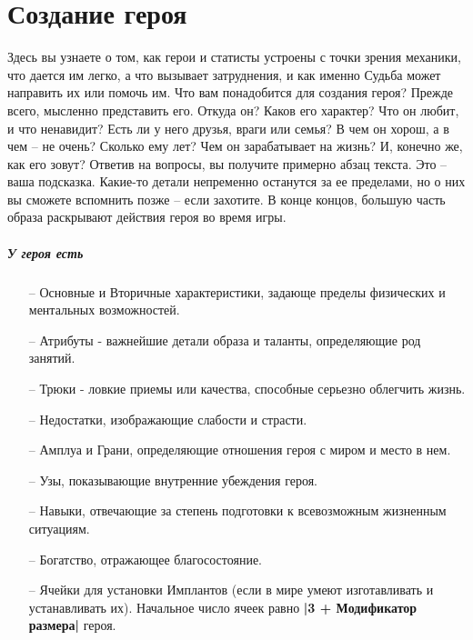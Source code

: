 \chapter{Создание героя}
Здесь вы узнаете о том, как герои и статисты устроены с точки зрения механики, что дается им легко, а что вызывает затруднения, и как именно Судьба может направить их или помочь им.
\newline Что вам понадобится для создания героя? Прежде всего, мысленно представить его. Откуда он? Каков его характер? Что он любит, и что ненавидит? Есть ли у него друзья, враги или семья? В чем он хорош, а в чем – не очень? Сколько ему лет? Чем он зарабатывает на жизнь? И, конечно же, как его зовут?
\newline Ответив на вопросы, вы получите примерно абзац текста. Это – ваша подсказка. Какие-то детали непременно останутся за ее пределами, но о них вы сможете вспомнить позже – если захотите. В конце концов, большую часть образа раскрывают действия героя во время игры. 

\paragraph{У героя есть}
\begin{itemize}
\item[--] Основные и Вторичные характеристики, задающе пределы физических и ментальных возможностей.
\item[--] Атрибуты - важнейшие детали образа и таланты, определяющие род занятий.
\item[--] Трюки - ловкие приемы или качества, способные серьезно облегчить жизнь.
\item[--] Недостатки, изображающие слабости и страсти.
\item[--] Амплуа и Грани, определяющие отношения героя с миром и место в нем.
\item[--] Узы, показывающие внутренние убеждения героя.
\item[--] Навыки, отвечающие за степень подготовки к всевозможным жизненным ситуациям.
\item[--] Богатство, отражающее благосостояние.
\item[--] Ячейки для установки Имплантов (если в мире умеют изготавливать и устанавливать их). Начальное число ячеек равно \textbf{|3 + Модификатор размера|} героя.
\end{itemize}



